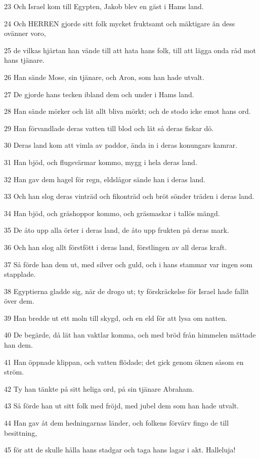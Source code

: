 \par 23 Och Israel kom till Egypten, Jakob blev en gäst i Hams land.
\par 24 Och HERREN gjorde sitt folk mycket fruktsamt och mäktigare än dess ovänner voro,
\par 25 de vilkas hjärtan han vände till att hata hans folk, till att lägga onda råd mot hans tjänare.
\par 26 Han sände Mose, sin tjänare, och Aron, som han hade utvalt.
\par 27 De gjorde hans tecken ibland dem och under i Hams land.
\par 28 Han sände mörker och lät allt bliva mörkt; och de stodo icke emot hans ord.
\par 29 Han förvandlade deras vatten till blod och lät så deras fiskar dö.
\par 30 Deras land kom att vimla av paddor, ända in i deras konungars kamrar.
\par 31 Han bjöd, och flugsvärmar kommo, mygg i hela deras land.
\par 32 Han gav dem hagel för regn, eldslågor sände han i deras land.
\par 33 Och han slog deras vinträd och fikonträd och bröt sönder träden i deras land.
\par 34 Han bjöd, och gräshoppor kommo, och gräsmaskar i tallös mängd.
\par 35 De åto upp alla örter i deras land, de åto upp frukten på deras mark.
\par 36 Och han slog allt förstfött i deras land, förstlingen av all deras kraft.
\par 37 Så förde han dem ut, med silver och guld, och i hans stammar var ingen som stapplade.
\par 38 Egyptierna gladde sig, när de drogo ut; ty förskräckelse för Israel hade fallit över dem.
\par 39 Han bredde ut ett moln till skygd, och en eld för att lysa om natten.
\par 40 De begärde, då lät han vaktlar komma, och med bröd från himmelen mättade han dem.
\par 41 Han öppnade klippan, och vatten flödade; det gick genom öknen såsom en ström.
\par 42 Ty han tänkte på sitt heliga ord, på sin tjänare Abraham.
\par 43 Så förde han ut sitt folk med fröjd, med jubel dem som han hade utvalt.
\par 44 Han gav åt dem hedningarnas länder, och folkens förvärv fingo de till besittning,
\par 45 för att de skulle hålla hans stadgar och taga hans lagar i akt. Halleluja!

